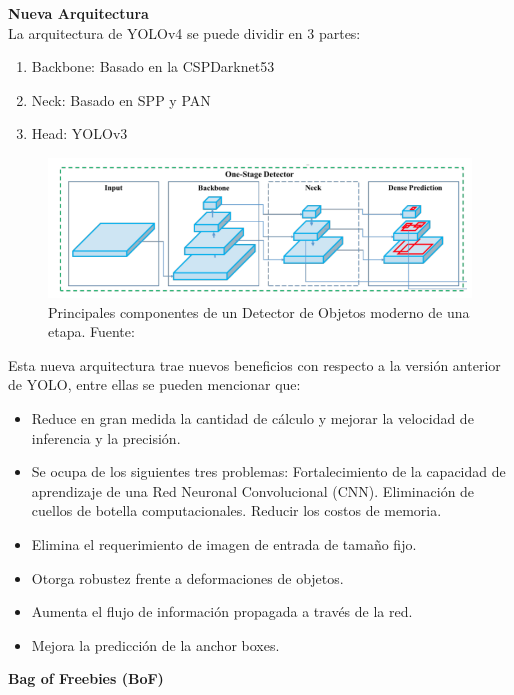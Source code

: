 \textbf{Nueva Arquitectura} \\

La arquitectura de YOLOv4 se puede dividir en 3 partes:
\begin{enumerate}
    \item {Backbone: Basado en la CSPDarknet53}
    \item {Neck: Basado en SPP y PAN}
    \item {Head: YOLOv3}
\end{enumerate}

\begin{figure}
    \centering
    \includegraphics[width=1\textwidth]{img/ObjectDetectionArqui.png}
    \caption{Principales componentes de un Detector de Objetos moderno de una etapa. Fuente: \cite{yolov4}}
    \label{fig:object-detection-arqui}
\end{figure}

Esta nueva arquitectura trae nuevos beneficios con respecto a la versión anterior de YOLO, entre ellas se pueden mencionar que: 
\begin{itemize}
    \item Reduce en gran medida la cantidad de cálculo y mejorar la velocidad de inferencia y la precisión.
    \item Se ocupa de los siguientes tres problemas: Fortalecimiento de la capacidad de aprendizaje de una Red Neuronal Convolucional (CNN).
    Eliminación de cuellos de botella computacionales.
    Reducir los costos de memoria.
    \item Elimina el requerimiento de imagen de entrada de tamaño fijo.
    \item Otorga robustez frente a deformaciones de objetos.
    \item Aumenta el flujo de información propagada a través de la red.
    \item Mejora la predicción de la anchor boxes.
\end{itemize}
\hfill \break

\textbf{Bag of Freebies (BoF)} \\

